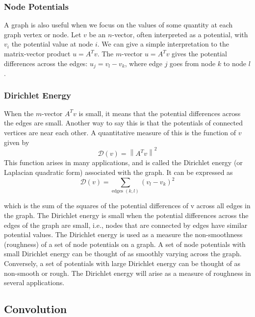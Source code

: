 \subsubsection{Node Potentials}

A graph is also useful when we focus on the values of some quantity at each graph vertex or node. Let $ v $ be an $ n $-vector, often interpreted as a potential, with $ v_{i} $ the potential value at node $ i $. We can give a simple interpretation to the matrix-vector product $ u=A^{T} v $. The $ m $-vector $ u=A^{T} v $ gives the potential differences across the edges: $ u_{j}=v_{l}-v_{k} $, where edge $ j $ goes from node $ k $ to node $ l $.

\subsubsection{Dirichlet Energy}

When the $ m $-vector $ A^{T} v $ is small, it means that the potential differences across the edges are small. Another way to say this is that the potentials of connected vertices are near each other. A quantitative measure of this is the function of $ v $ given by
\begin{equation}
\mathcal{D}(v)=\left\|A^{T} v\right\|^{2}
\end{equation}
This function arises in many applications, and is called the Dirichlet energy (or Laplacian quadratic form) associated with the graph. It can be expressed as
\begin{equation}
\mathcal{D}(v)=\sum_{\text {edges }(k, l)}\left(v_{l}-v_{k}\right)^{2}
\end{equation}

which is the sum of the squares of the potential differences of v across all edges in
the graph. The Dirichlet energy is small when the potential differences across the
edges of the graph are small, i.e., nodes that are connected by edges have similar
potential values.
The Dirichlet energy is used as a measure the non-smoothness (roughness) of
a set of node potentials on a graph. A set of node potentials with small Dirichlet
energy can be thought of as smoothly varying across the graph. Conversely, a set
of potentials with large Dirichlet energy can be thought of as non-smooth or rough.
The Dirichlet energy will arise as a measure of roughness in several applications.

\subsection{Convolution}


